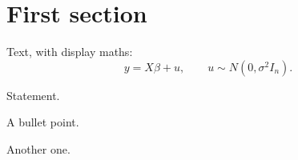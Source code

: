 \documentclass[11pt]{article}
\begin{document}

\section{First section}

Text, with display maths:
\[ y=X\beta+u,\qquad u\sim N(0,\sigma^2I_n). \]

Statement.

\begin{flatlist}
  \item A bullet point.
  \item Another one.
\end{flatlist}
\end{document}
